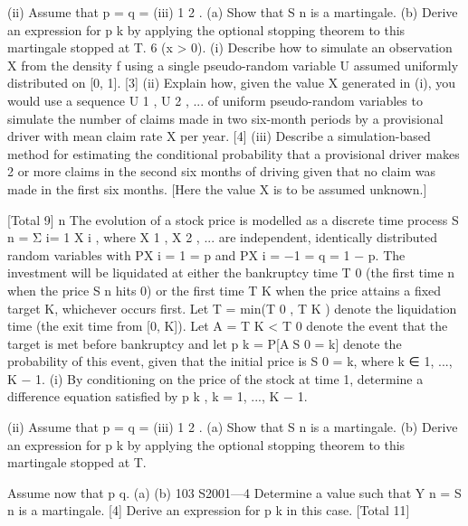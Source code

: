 (ii) Assume that p = q =
(iii)
1
2
.
(a) Show that S n is a martingale.
(b) Derive an expression for p k by applying the optional stopping
theorem to this martingale stopped at T.
6
(x > 0).
(i) Describe how to simulate an observation X from the density f using a
single pseudo-random variable U assumed uniformly distributed on [0, 1].
[3]
(ii) Explain how, given the value X generated in (i), you would use a sequence
U 1 , U 2 , ... of uniform pseudo-random variables to simulate the number of
claims made in two six-month periods by a provisional driver with mean
claim rate X per year.
[4]
(iii) Describe a simulation-based method for estimating the conditional
probability that a provisional driver makes 2 or more claims in the second
six months of driving given that no claim was made in the first six
months. [Here the value X is to be assumed unknown.]

[Total 9]
n
The evolution of a stock price is modelled as a discrete time process S n = Σ i=
1 X i ,
where X 1 , X 2 , ... are independent, identically distributed random variables with
P{X i = 1} = p and P{X i = −1} = q = 1 − p. The investment will be liquidated at
either the bankruptcy time T 0 (the first time n when the price S n hits 0) or the
first time T K when the price attains a fixed target K, whichever occurs first.
Let T = min(T 0 , T K ) denote the liquidation time (the exit time from [0, K]). Let
A = {T K < T 0 } denote the event that the target is met before bankruptcy and let
p k = P[AS 0 = k] denote the probability of this event, given that the initial price is
S 0 = k, where k ∈ {1, ..., K − 1}.
(i) By conditioning on the price of the stock at time 1, determine a difference
equation satisfied by p k , k = 1, ..., K − 1.

(ii) Assume that p = q =
(iii)
1
2
.
(a) Show that S n is a martingale.
(b) Derive an expression for p k by applying the optional stopping
theorem to this martingale stopped at T.


Assume now that p \neq q.
(a)
(b)
103 S2001—4
Determine a value \theta {} such that Y n = \theta S n is a martingale.
[4]
Derive an expression for p k in this case.
[Total 11]

